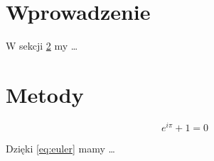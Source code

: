 \documentclass{article}
\begin{document}
\section{Wprowadzenie}
\label{sec:intro}

W sekcji \ref{sec:method} my \ldots

\section{Metody}
\label{sec:method}

\begin{equation}
\label{eq:euler}
e^{i\pi} + 1 = 0
\end{equation}

Dzięki \eqref{eq:euler} mamy \ldots
\end{document}
